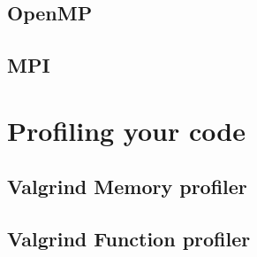 \documentclass[11pt]{article}
\begin{document}
\subsection{OpenMP}

\subsection{MPI}

\section{Profiling your code}

\subsection{Valgrind Memory profiler}

\subsection{Valgrind Function profiler}
\end{document}
